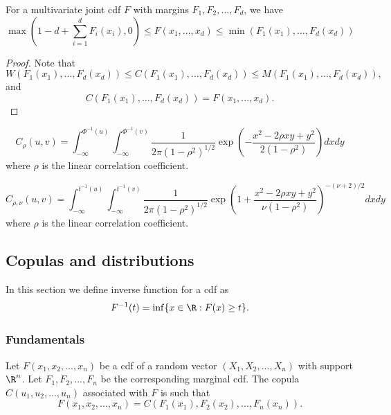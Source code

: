 \begin{refsection}
\begin{corollary}
For a multivariate joint cdf $F$ with margins $F_1,F_2,...,F_d$, we have
$$\max(1 - d + \sum_{i=1}^d F_i(x_i),0) \leq F(x_1,...,x_d) \leq \min(F_1(x_1),...,F_d(x_d))$$	
\end{corollary}
\begin{proof}
Note that
$$W(F_1(x_1),...,F_d(x_d))\leq C(F_1(x_1),...,F_d(x_d)) \leq M(F_1(x_1),...,F_d(x_d)),$$
and 
$$C(F_1(x_1),...,F_d(x_d)) = F(x_1,...,x_d).$$	
\end{proof}

\begin{example}
$$C_{\rho}(u,v) = \int_{-\infty}^{\Phi^{-1}(u)}\int_{-\infty}^{\Phi^{-1}(v)}\frac{1}{2\pi(1-\rho^2)^{1/2}}\exp(-\frac{x^2-2\rho x y + y^2}{2(1-\rho^2)}) dxdy$$
where $\rho$ is the linear correlation coefficient.
\end{example}



\begin{example}
	$$C_{\rho,\nu}(u,v) = \int_{-\infty}^{t^{-1}(u)}\int_{-\infty}^{t^{-1}(v)}\frac{1}{2\pi(1-\rho^2)^{1/2}}\exp(1 + \frac{x^2-2\rho x y + y^2}{\nu (1-\rho^2)})^{-(\nu+2)/2} dxdy$$
	where $\rho$ is the linear correlation coefficient.
\end{example}






\subsection{Copulas and distributions}

\begin{note}
In this section we define inverse function for a cdf as
$$F^{-1}(t) = \inf\{x\in\R: F(x)\geq t\}.$$	
\end{note}


\subsubsection{Fundamentals}
\begin{definition}\cite[3]{Ruschendorf2013mathematical}
Let $F(x_1,x_2,...,x_n)$ be a cdf of a random vector $(X_1,X_2,...,X_n)$ with support $\R^n$. Let $F_1,F_2, ...,F_n$ be the corresponding marginal cdf. The copula $C(u_1,u_2,...,u_n)$ associated with $F$ is such that 
$$F(x_1,x_2,...,x_n) = C(F_1(x_1),F_2(x_2),...,F_n(x_n)).$$	
\end{definition}





\end{refsection}
